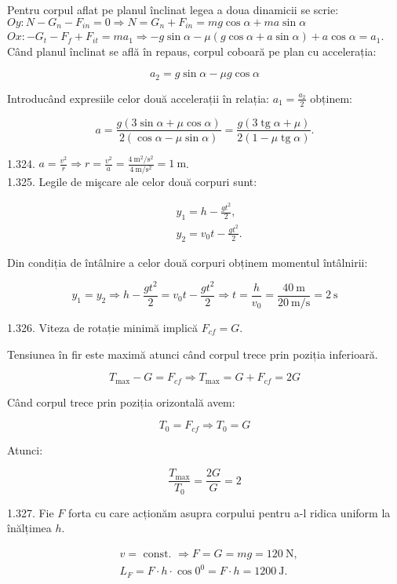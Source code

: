 Pentru corpul aflat pe planul înclinat legea a doua dinamicii se scrie:\\
$O y: N-G_{n}-F_{i n}=0 \Rightarrow N=G_{n}+F_{i n}=m g \cos \alpha+m a \sin \alpha$\\
$O x:-G_{t}-F_{f}+F_{i t}=m a_{1} \Rightarrow-g \sin \alpha-\mu(g \cos \alpha+a \sin \alpha)+a \cos \alpha=a_{1}$.\\
Când planul înclinat se află în repaus, corpul coboară pe plan cu accelerația:

$$
a_{2}=g \sin \alpha-\mu g \cos \alpha
$$

Introducând expresiile celor două accelerații în relația: $a_{1}=\frac{a_{2}}{2}$ obținem:

$$
a=\frac{g(3 \sin \alpha+\mu \cos \alpha)}{2(\cos \alpha-\mu \sin \alpha)}=\frac{g(3 \operatorname{tg} \alpha+\mu)}{2(1-\mu \operatorname{tg} \alpha)} .
$$

1.324. $a=\frac{v^{2}}{r} \Rightarrow r=\frac{v^{2}}{a}=\frac{4 \mathrm{~m}^{2} / \mathrm{s}^{2}}{4 \mathrm{~m} / \mathrm{s}^{2}}=1 \mathrm{~m}$.\\
1.325. Legile de mişcare ale celor două corpuri sunt:

$$
\begin{aligned}
& y_{1}=h-\frac{g t^{2}}{2}, \\
& y_{2}=v_{0} t-\frac{g t^{2}}{2} .
\end{aligned}
$$

Din condiția de întâlnire a celor două corpuri obținem momentul întâlnirii:

$$
y_{1}=y_{2} \Rightarrow h-\frac{g t^{2}}{2}=v_{0} t-\frac{g t^{2}}{2} \Rightarrow t=\frac{h}{v_{0}}=\frac{40 \mathrm{~m}}{20 \mathrm{~m} / \mathrm{s}}=2 \mathrm{~s}
$$

1.326. Viteza de rotație minimă implică $F_{c f}=G$.

Tensiunea în fir este maximă atunci când corpul trece prin poziția inferioară.

$$
T_{\max }-G=F_{c f} \Rightarrow T_{\max }=G+F_{c f}=2 G
$$

Când corpul trece prin poziția orizontală avem:

$$
T_{0}=F_{c f} \Rightarrow T_{0}=G
$$

Atunci:

$$
\frac{T_{\max }}{T_{0}}=\frac{2 G}{G}=2
$$

1.327. Fie $F$ forta cu care acționăm asupra corpului pentru a-l ridica uniform la înălțimea $h$.

$$
\begin{aligned}
& v=\text { const. } \Rightarrow F=G=m g=120 \mathrm{~N}, \\
& L_{F}=F \cdot h \cdot \cos 0^{0}=F \cdot h=1200 \mathrm{~J} .
\end{aligned}
$$

